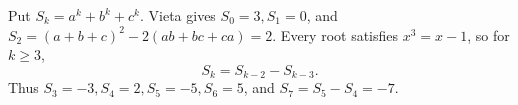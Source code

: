 Put $S_k=a^k+b^k+c^k$. Vieta gives $S_0=3,S_1=0$, and $S_2=(a+b+c)^2-2(ab+bc+ca)=2$. Every root satisfies $x^3=x-1$, so for $k\ge3$,
\[S_k=S_{k-2}-S_{k-3}.\]
Thus $S_3=-3,S_4=2,S_5=-5,S_6=5$, and $S_7=S_5-S_4=\boxed{-7}$.
